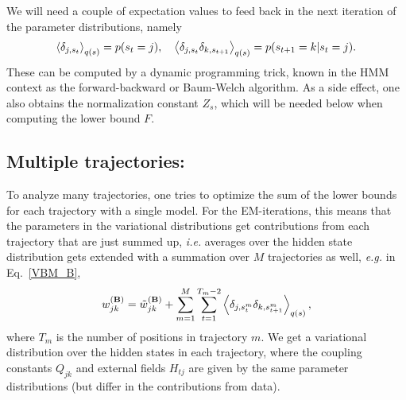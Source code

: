 We will need a couple of expectation values to feed back in the next
iteration of the parameter distributions, namely
\begin{equation}
  \left\langle \delta_{j,s_t}\right\rangle_{q(s)}=p(s_t=j),\quad
  \left\langle \delta_{j,s_t}\delta_{k,s_{t+1}}\right\rangle_{q(s)}=p(s_{t+1}=k|s_t=j).
\end{equation}
These can be computed by a dynamic programming
trick\cite{Bishop2006,Mackay1997,Beal2003}, known in the HMM context
as the forward-backward or Baum-Welch
algorithm\cite{Rabiner1989,Baum1972}. As a side effect, one also
obtains the normalization constant $Z_s$, which will be needed below
when computing the lower bound $F$.

\subsection{Multiple trajectories:}
To analyze many trajectories, one tries to optimize the sum of the
lower bounds for each trajectory with a single model. For the
EM-iterations, this means that the parameters in the variational
distributions get contributions from each trajectory that are just
summed up, \textit{i.e.} averages over the hidden state distribution
gets extended with a summation over $M$ trajectories as
well, \textit{e.g.} in Eq.~\eqref{VBM_B},
\begin{equation}
w_{jk}^{(\mathbf{B})}=\tilde w_{jk}^{(\mathbf{B})}
  +\sum_{m=1}^M\sum_{t=1}^{T_m-2}\left\langle \delta_{j,s^m_t}\delta_{k,s^m_{t+1}}\right\rangle_{q(s)},
\end{equation}
where $T_m$ is the number of positions in trajectory $m$. We get a
variational distribution over the hidden states in each trajectory,
where the coupling constants $Q_{jk}$ and external fields $H_{tj}$ are
given by the same parameter distributions (but differ in the
contributions from data).


